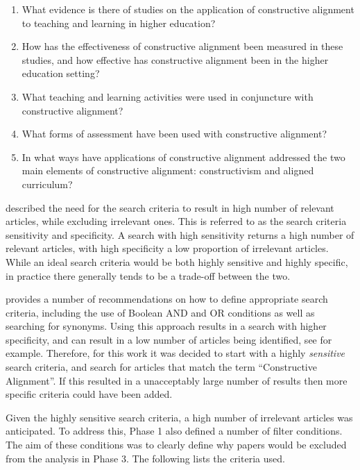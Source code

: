 \begin{enumerate}
	\item What evidence is there of studies on the application of constructive alignment to teaching and learning in higher education?
	\item How has the effectiveness of constructive alignment been measured in these studies, and how effective has constructive alignment been in the higher education setting?
	\item What teaching and learning activities were used in conjuncture with constructive alignment?
	\item What forms of assessment have been used with constructive alignment?
	\item In what ways have applications of constructive alignment addressed the two main elements of constructive alignment: constructivism and aligned curriculum?
\end{enumerate}

\citet{Petticrew:2008} described the need for the search criteria to result in high number of relevant articles, while excluding irrelevant ones. This is referred to as the search criteria sensitivity and specificity. A search with high sensitivity returns a high number of relevant articles, with high specificity a low proportion of irrelevant articles. While an ideal search criteria would be both highly sensitive and highly specific, in practice there generally tends to be a trade-off between the two. 

\citet{Kitchenham:2004} provides a number of recommendations on how to define appropriate search criteria, including the use of Boolean AND and OR conditions as well as searching for synonyms. Using this approach results in a search with higher specificity, and can result in a low number of articles being identified, see \citet{Salleh:2011} for example. Therefore, for this work it was decided to start with a highly \emph{sensitive} search criteria, and search for articles that match the term ``Constructive Alignment''. If this resulted in a unacceptably large number of results then more specific criteria could have been added.

Given the highly sensitive search criteria, a high number of irrelevant articles was anticipated. To address this, Phase 1 also defined a number of filter conditions. The aim of these conditions was to clearly define why papers would be excluded from the analysis in Phase 3. The following lists the criteria used.

